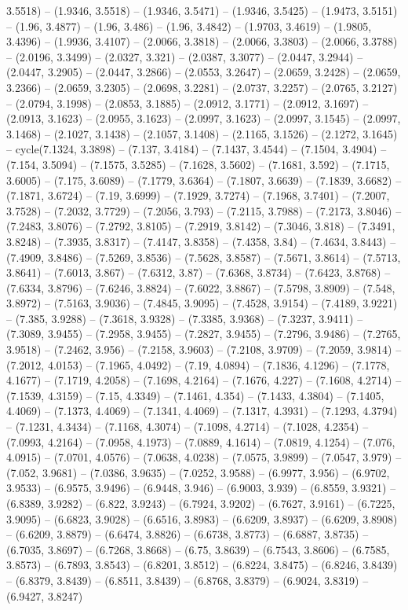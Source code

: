 3.5518) -- (1.9346, 3.5518) -- (1.9346, 3.5471) -- (1.9346, 3.5425) -- (1.9473, 3.5151) -- (1.96, 3.4877) -- (1.96, 3.486) -- (1.96, 3.4842) -- (1.9703, 3.4619) -- (1.9805, 3.4396) -- (1.9936, 3.4107) -- (2.0066, 3.3818) -- (2.0066, 3.3803) -- (2.0066, 3.3788) -- (2.0196, 3.3499) -- (2.0327, 3.321) -- (2.0387, 3.3077) -- (2.0447, 3.2944) -- (2.0447, 3.2905) -- (2.0447, 3.2866) -- (2.0553, 3.2647) -- (2.0659, 3.2428) -- (2.0659, 3.2366) -- (2.0659, 3.2305) -- (2.0698, 3.2281) -- (2.0737, 3.2257) -- (2.0765, 3.2127) -- (2.0794, 3.1998) -- (2.0853, 3.1885) -- (2.0912, 3.1771) -- (2.0912, 3.1697) -- (2.0913, 3.1623) -- (2.0955, 3.1623) -- (2.0997, 3.1623) -- (2.0997, 3.1545) -- (2.0997, 3.1468) -- (2.1027, 3.1438) -- (2.1057, 3.1408) -- (2.1165, 3.1526) -- (2.1272, 3.1645) -- cycle(7.1324, 3.3898) -- (7.137, 3.4184) -- (7.1437, 3.4544) -- (7.1504, 3.4904) -- (7.154, 3.5094) -- (7.1575, 3.5285) -- (7.1628, 3.5602) -- (7.1681, 3.592) -- (7.1715, 3.6005) -- (7.175, 3.6089) -- (7.1779, 3.6364) -- (7.1807, 3.6639) -- (7.1839, 3.6682) -- (7.1871, 3.6724) -- (7.19, 3.6999) -- (7.1929, 3.7274) -- (7.1968, 3.7401) -- (7.2007, 3.7528) -- (7.2032, 3.7729) -- (7.2056, 3.793) -- (7.2115, 3.7988) -- (7.2173, 3.8046) -- (7.2483, 3.8076) -- (7.2792, 3.8105) -- (7.2919, 3.8142) -- (7.3046, 3.818) -- (7.3491, 3.8248) -- (7.3935, 3.8317) -- (7.4147, 3.8358) -- (7.4358, 3.84) -- (7.4634, 3.8443) -- (7.4909, 3.8486) -- (7.5269, 3.8536) -- (7.5628, 3.8587) -- (7.5671, 3.8614) -- (7.5713, 3.8641) -- (7.6013, 3.867) -- (7.6312, 3.87) -- (7.6368, 3.8734) -- (7.6423, 3.8768) -- (7.6334, 3.8796) -- (7.6246, 3.8824) -- (7.6022, 3.8867) -- (7.5798, 3.8909) -- (7.548, 3.8972) -- (7.5163, 3.9036) -- (7.4845, 3.9095) -- (7.4528, 3.9154) -- (7.4189, 3.9221) -- (7.385, 3.9288) -- (7.3618, 3.9328) -- (7.3385, 3.9368) -- (7.3237, 3.9411) -- (7.3089, 3.9455) -- (7.2958, 3.9455) -- (7.2827, 3.9455) -- (7.2796, 3.9486) -- (7.2765, 3.9518) -- (7.2462, 3.956) -- (7.2158, 3.9603) -- (7.2108, 3.9709) -- (7.2059, 3.9814) -- (7.2012, 4.0153) -- (7.1965, 4.0492) -- (7.19, 4.0894) -- (7.1836, 4.1296) -- (7.1778, 4.1677) -- (7.1719, 4.2058) -- (7.1698, 4.2164) -- (7.1676, 4.227) -- (7.1608, 4.2714) -- (7.1539, 4.3159) -- (7.15, 4.3349) -- (7.1461, 4.354) -- (7.1433, 4.3804) -- (7.1405, 4.4069) -- (7.1373, 4.4069) -- (7.1341, 4.4069) -- (7.1317, 4.3931) -- (7.1293, 4.3794) -- (7.1231, 4.3434) -- (7.1168, 4.3074) -- (7.1098, 4.2714) -- (7.1028, 4.2354) -- (7.0993, 4.2164) -- (7.0958, 4.1973) -- (7.0889, 4.1614) -- (7.0819, 4.1254) -- (7.076, 4.0915) -- (7.0701, 4.0576) -- (7.0638, 4.0238) -- (7.0575, 3.9899) -- (7.0547, 3.979) -- (7.052, 3.9681) -- (7.0386, 3.9635) -- (7.0252, 3.9588) -- (6.9977, 3.956) -- (6.9702, 3.9533) -- (6.9575, 3.9496) -- (6.9448, 3.946) -- (6.9003, 3.939) -- (6.8559, 3.9321) -- (6.8389, 3.9282) -- (6.822, 3.9243) -- (6.7924, 3.9202) -- (6.7627, 3.9161) -- (6.7225, 3.9095) -- (6.6823, 3.9028) -- (6.6516, 3.8983) -- (6.6209, 3.8937) -- (6.6209, 3.8908) -- (6.6209, 3.8879) -- (6.6474, 3.8826) -- (6.6738, 3.8773) -- (6.6887, 3.8735) -- (6.7035, 3.8697) -- (6.7268, 3.8668) -- (6.75, 3.8639) -- (6.7543, 3.8606) -- (6.7585, 3.8573) -- (6.7893, 3.8543) -- (6.8201, 3.8512) -- (6.8224, 3.8475) -- (6.8246, 3.8439) -- (6.8379, 3.8439) -- (6.8511, 3.8439) -- (6.8768, 3.8379) -- (6.9024, 3.8319) -- (6.9427, 3.8247) 